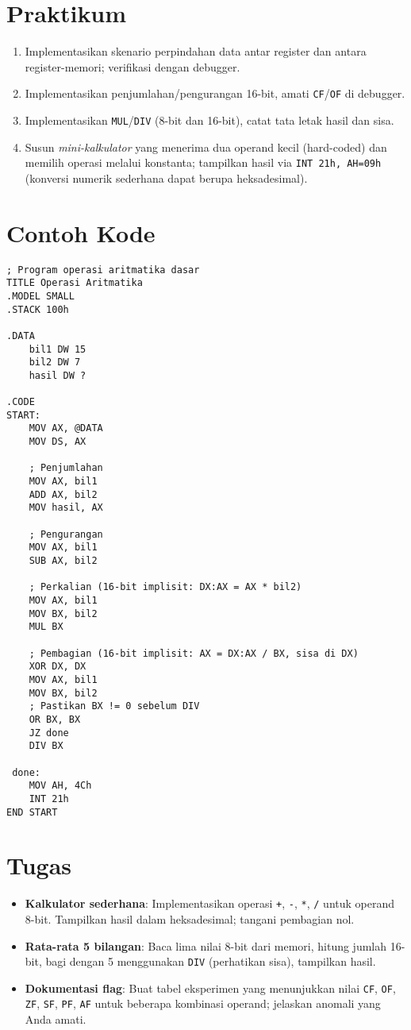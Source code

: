 \section{Praktikum}
\begin{enumerate}
  \item Implementasikan skenario perpindahan data antar register dan antara register-memori; verifikasi dengan debugger.
  \item Implementasikan penjumlahan/pengurangan 16-bit, amati \texttt{CF}/\texttt{OF} di debugger.
  \item Implementasikan \texttt{MUL}/\texttt{DIV} (8-bit dan 16-bit), catat tata letak hasil dan sisa.
  \item Susun \textit{mini-kalkulator} yang menerima dua operand kecil (hard-coded) dan memilih operasi melalui konstanta; tampilkan hasil via \texttt{INT 21h, AH=09h} (konversi numerik sederhana dapat berupa heksadesimal).
\end{enumerate}

\section{Contoh Kode}
\begin{verbatim}
; Program operasi aritmatika dasar
TITLE Operasi Aritmatika
.MODEL SMALL
.STACK 100h

.DATA
    bil1 DW 15
    bil2 DW 7
    hasil DW ?

.CODE
START:
    MOV AX, @DATA
    MOV DS, AX
    
    ; Penjumlahan
    MOV AX, bil1
    ADD AX, bil2
    MOV hasil, AX
    
    ; Pengurangan
    MOV AX, bil1
    SUB AX, bil2
    
    ; Perkalian (16-bit implisit: DX:AX = AX * bil2)
    MOV AX, bil1
    MOV BX, bil2
    MUL BX
    
    ; Pembagian (16-bit implisit: AX = DX:AX / BX, sisa di DX)
    XOR DX, DX
    MOV AX, bil1
    MOV BX, bil2
    ; Pastikan BX != 0 sebelum DIV
    OR BX, BX
    JZ done
    DIV BX

 done:
    MOV AH, 4Ch
    INT 21h
END START
\end{verbatim}

\section{Tugas}
\begin{itemize}
  \item \textbf{Kalkulator sederhana}: Implementasikan operasi \texttt{+}, \texttt{-}, \texttt{*}, \texttt{/} untuk operand 8-bit. Tampilkan hasil dalam heksadesimal; tangani pembagian nol.
  \item \textbf{Rata-rata 5 bilangan}: Baca lima nilai 8-bit dari memori, hitung jumlah 16-bit, bagi dengan 5 menggunakan \texttt{DIV} (perhatikan sisa), tampilkan hasil.
  \item \textbf{Dokumentasi flag}: Buat tabel eksperimen yang menunjukkan nilai \texttt{CF}, \texttt{OF}, \texttt{ZF}, \texttt{SF}, \texttt{PF}, \texttt{AF} untuk beberapa kombinasi operand; jelaskan anomali yang Anda amati.
\end{itemize}

